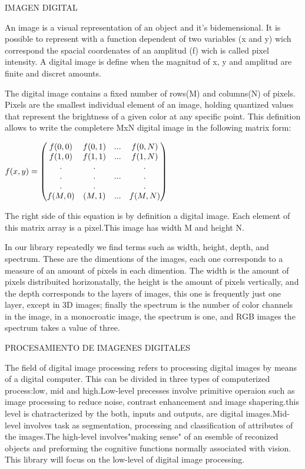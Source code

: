 \documentclass[a4paper]{article}
\begin{document}
IMAGEN DIGITAL

An image is a visual representation of an object and it's bidemensional. It is possible to represent with a function dependent of two variables (x and y) wich correspond the spacial coordenates of an amplitud (f) wich is called pixel intensity. A digital image is define when the magnitud of x, y and amplitud are finite and discret amounts.

The digital image contains a fixed number of rows(M) and columns(N) of pixels. Pixels are the smallest individual element of an image, holding quantized values that represent the brightness of a given color at any specific point. This definition allows to write the completere MxN digital image in the following matrix form: \\

\begin{center}
\begin{math}
	\centering
	f(x,y)=
   \begin{pmatrix} 
    f(0,0) & f(0,1) & ... & f(0,N) \\ 
 	f(1,0) & f(1,1) & ... & f(1,N) \\
    . & . &  & . \\
    . & . & ... & . \\
    . & . &  & . \\
    f(M,0) & (M,1) & ... & f(M,N) \\
   \end{pmatrix}
\end{math}\\
\end{center}

The right side of this equation is by definition a digital image. Each element of this matrix array is a pixel.This image has width M and height N. 

In our library repeatedly we find terms such as width, height, depth, and spectrum. These are the dimentions of the images, each one corresponds to a measure of an amount of pixels in each dimention. The width is the amount of pixels distribuited horizonatally, the height is the amount of pixels vertically, and the depth corresponds to the layers of images, this one is frequently just one layer, except in 3D images; finally the spectrum is the number of color channels in the image, in a monocroatic image, the spectrum is one, and RGB images the spectrum takes a value of three.

PROCESAMIENTO DE IMAGENES DIGITALES

The field of digital image processing refers to processing digital images by means of a digital computer. This can be divided in three types of computerized process:low, mid and high.Low-level precesses involve primitive operaion such as image processing to reduce noise, contrast enhancement and image shapering.this level is chatracterized by the both, inputs and outputs, are digital images.Mid-level involves task as segmentation, processing and classification of attributes of the images.The high-level involves"making sense" of an esemble of reconized objects and preforming the cognitive functions normally associated with vision. This library will focus on the low-level of digital image processing.
\end{document}
